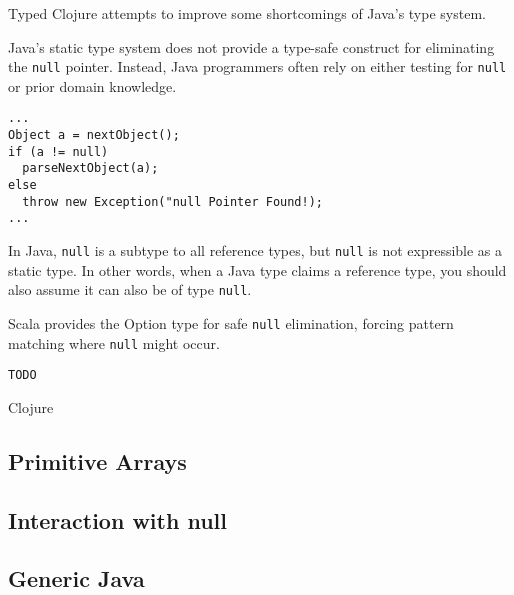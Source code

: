 Typed Clojure attempts to improve some shortcomings of Java's type system.

Java's static type system does not provide a type-safe construct for eliminating
the \lstinline|null| pointer. Instead, Java programmers often rely on either testing
for \lstinline|null| or prior domain knowledge.

\begin{lstlisting}[caption=null elimination in Java]
...
Object a = nextObject();
if (a != null)
  parseNextObject(a);
else
  throw new Exception("null Pointer Found!);
...
\end{lstlisting}



In Java, \lstinline|null| is a subtype to all reference
types, but \lstinline|null| is not expressible as a static type. In other words,
when a Java type claims a reference type, you should also assume it can also be of 
type \lstinline|null|.



Scala provides the Option type for safe \lstinline|null| elimination, forcing pattern matching
where \lstinline|null| might occur.

\begin{lstlisting}[caption=null elimination in Scala]
TODO
\end{lstlisting}

Clojure 

\subsection{Primitive Arrays}

\subsection{Interaction with null}
% 

\subsection{Generic Java}


